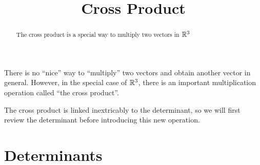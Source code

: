 \documentclass{ximera}
\title[Dig-In:]{Cross Product}
\begin{document}
\begin{abstract}
  The cross product is a special way to multiply two vectors in $\mathbb R^3$
\end{abstract}
\maketitle

There is no ``nice'' way to ``multiply'' two vectors and obtain
another vector in general. However, in the special case of
$\mathbb R^3$, there is an important multiplication operation called
``the cross product''.

The cross product is linked inextricably to the determinant, so we
will first review the determinant before introducing this new
operation.

\section{Determinants}
\end{document}

